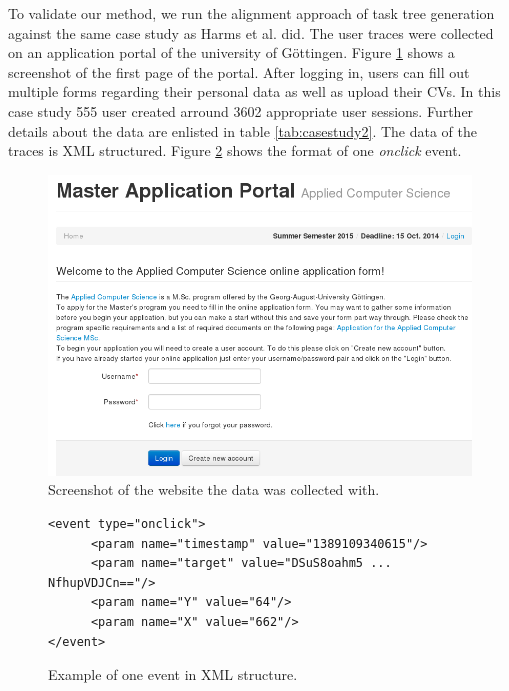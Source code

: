 To validate our method, we run the alignment approach of task tree generation against the same case study as Harms et al. did.
The user traces were collected on an application portal of the university of G\"ottingen.
Figure \ref{fig:screenshotmasterportal} shows a screenshot of the first page of the portal.
After logging in, users can fill out multiple forms regarding their personal data as well as upload their CVs.
In this case study 555 user created arround 3602 appropriate user sessions.
Further details about the data are enlisted in table \ref{tab:casestudy2}.
The data of the traces is XML structured. 
Figure \ref{fig:xml} shows the format of one \textit{onclick} event. 
\begin{figure}[h]
	\includegraphics[width=\textwidth]{chapters/casestudy/masterportalscreenshot.png}
	\caption{Screenshot of the website the data was collected with.}
	\label{fig:screenshotmasterportal}
\end{figure}
\begin{figure}
\begin{verbatim}
<event type="onclick">
      <param name="timestamp" value="1389109340615"/>
      <param name="target" value="DSuS8oahm5 ... NfhupVDJCn=="/>
      <param name="Y" value="64"/>
      <param name="X" value="662"/>
</event>
\end{verbatim}
\caption{Example of one event in XML structure.}
\label{fig:xml}
\end{figure}

